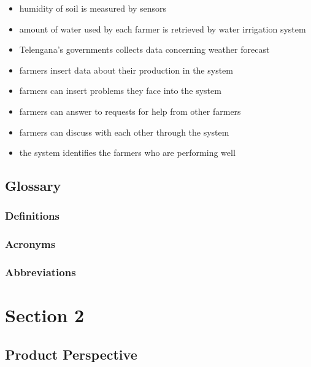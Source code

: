 \documentclass{article}
\begin{document}
\begin{itemize}
    \item humidity of soil is measured by sensors 
    \item amount of water used by each farmer is retrieved by water irrigation system
    \item Telengana's governments collects data concerning weather forecast
    \item farmers insert data about their production in the system
    \item farmers can insert problems they face into the system
    \item farmers can answer to requests for help from other farmers
    \item farmers can discuss with each other through the system
    \item the system identifies the farmers who are performing well
\end{itemize}

\subsection{Glossary}
\subsubsection{Definitions}
\subsubsection{Acronyms}
\subsubsection{Abbreviations}






\section{Section 2}
\subsection{Product Perspective}
\end{document}
